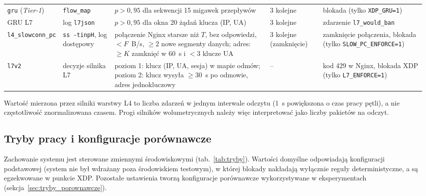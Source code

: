 \documentclass[a4paper,12pt]{article}
\begin{document}
\begin{table}[H]
\begin{tabularx}{\linewidth}{@{}L{2.0cm}L{2.1cm}Y L{1.65cm}L{1.9cm}@{}}
\texttt{gru} (\textit{Tier-1}) & \texttt{flow\_map} & $p>0{,}95$ dla sekwencji 15 migawek przepływów & 3 kolejne & blokada (tylko \texttt{XDP\_GRU=1}) \\
GRU L7 & log \texttt{l7json} & $p>0{,}95$ dla okna 20 żądań klucza (IP, UA) & 3 kolejne & zdarzenie \texttt{l7\_would\_ban} \\
\texttt{l4\_slowconn\_\allowbreak pc} & \texttt{ss -tinpH}, log dostępowy & połączenie Nginx starsze niż $T$, bez odpowiedzi, $<F$~B/s, $\geq 2$ nowe segmenty danych; adres: $\geq K$ zamknięć w 60~s i $<3$ klucze UA & 3 kolejne (zamknięcie) & zamknięcie połączenia, blokada (tylko \texttt{SLOW\_PC\_\allowbreak ENFORCE=1}) \\
\texttt{l7v2} & decyzje silnika L7 & poziom 1: klucz (IP, UA, sesja) w mapie odmów; poziom 2: klucz wysyła $\geq 30$~s po odmowie, adres jednokluczowy & -- & kod 429 w Nginx, blokada XDP (tylko \texttt{L7\_\allowbreak ENFORCE=1}) \\
\bottomrule
\end{tabularx}
\end{table}

Wartość mierzona przez silniki warstwy L4 to liczba zdarzeń w jednym interwale odczytu (1~s powiększona o czas pracy pętli), a nie częstotliwość znormalizowana czasem. Progi silników wolumetrycznych należy więc interpretować jako liczby pakietów na odczyt.

\subsection{Tryby pracy i konfiguracje porównawcze}\label{sec:tryby}
Zachowanie systemu jest sterowane zmiennymi środowiskowymi (tab.~\ref{tab:tryby}). Wartości domyślne odpowiadają konfiguracji podstawowej (system nie był wdrażany poza środowiskiem testowym), w której blokady nakładają wyłącznie reguły deterministyczne, a są egzekwowane w punkcie XDP. Pozostałe ustawienia tworzą konfiguracje porównawcze wykorzystywane w eksperymentach (sekcja~\ref{sec:tryby_porownawcze}).
\end{document}
